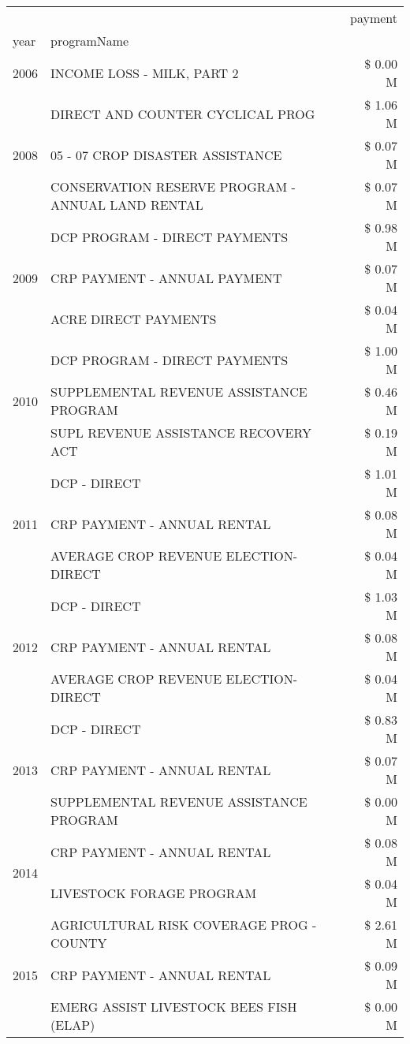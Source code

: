 \begin{tabular}{llr}
\toprule
 &  & payment \\
year & programName &  \\
\midrule
2006 & INCOME LOSS - MILK, PART 2 & \$ 0.00 M \\
\cline{1-3}
\multirow[t]{3}{*}{2008} & DIRECT AND COUNTER CYCLICAL PROG & \$ 1.06 M \\
 & 05 - 07 CROP DISASTER ASSISTANCE & \$ 0.07 M \\
 & CONSERVATION RESERVE PROGRAM - ANNUAL LAND RENTAL & \$ 0.07 M \\
\cline{1-3}
\multirow[t]{3}{*}{2009} & DCP PROGRAM - DIRECT PAYMENTS & \$ 0.98 M \\
 & CRP PAYMENT - ANNUAL PAYMENT & \$ 0.07 M \\
 & ACRE DIRECT PAYMENTS & \$ 0.04 M \\
\cline{1-3}
\multirow[t]{3}{*}{2010} & DCP PROGRAM - DIRECT PAYMENTS & \$ 1.00 M \\
 & SUPPLEMENTAL REVENUE ASSISTANCE PROGRAM & \$ 0.46 M \\
 & SUPL REVENUE ASSISTANCE RECOVERY ACT & \$ 0.19 M \\
\cline{1-3}
\multirow[t]{3}{*}{2011} & DCP - DIRECT & \$ 1.01 M \\
 & CRP PAYMENT - ANNUAL RENTAL & \$ 0.08 M \\
 & AVERAGE CROP REVENUE ELECTION-DIRECT & \$ 0.04 M \\
\cline{1-3}
\multirow[t]{3}{*}{2012} & DCP - DIRECT & \$ 1.03 M \\
 & CRP PAYMENT - ANNUAL RENTAL & \$ 0.08 M \\
 & AVERAGE CROP REVENUE ELECTION-DIRECT & \$ 0.04 M \\
\cline{1-3}
\multirow[t]{3}{*}{2013} & DCP - DIRECT & \$ 0.83 M \\
 & CRP PAYMENT - ANNUAL RENTAL & \$ 0.07 M \\
 & SUPPLEMENTAL REVENUE ASSISTANCE PROGRAM & \$ 0.00 M \\
\cline{1-3}
\multirow[t]{2}{*}{2014} & CRP PAYMENT - ANNUAL RENTAL & \$ 0.08 M \\
 & LIVESTOCK FORAGE PROGRAM & \$ 0.04 M \\
\cline{1-3}
\multirow[t]{3}{*}{2015} & AGRICULTURAL RISK COVERAGE PROG - COUNTY & \$ 2.61 M \\
 & CRP PAYMENT - ANNUAL RENTAL & \$ 0.09 M \\
 & EMERG ASSIST LIVESTOCK BEES FISH (ELAP) & \$ 0.00 M \\

\end{tabular}
